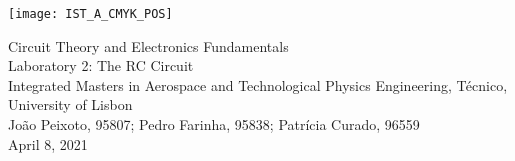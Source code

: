 
\thispagestyle {empty}

\texttt{[image: IST\_A\_CMYK\_POS]}


\begin{center}
\linespread{1.3}
%
\vspace{1.0cm}

\vspace{1cm}
{\FontLb Circuit Theory and Electronics Fundamentals} \\
\vspace{1cm}
{\FontLb Laboratory 2: The RC Circuit} \\
\vspace{2cm}
{\FontSn Integrated Masters in Aerospace and Technological Physics Engineering, Técnico, University of Lisbon} \\ %
\vspace{1cm}
{\FontSn João Peixoto, 95807; Pedro Farinha, 95838; Patrícia Curado, 96559} \\
\vspace{1cm}
{\FontSn April 8, 2021} \\ %
\par
%
\end{center}

